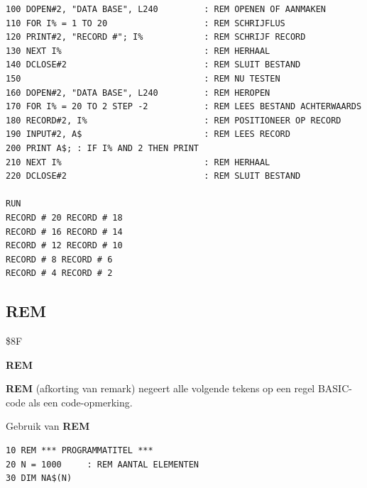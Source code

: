 \begin{description}[leftmargin=2cm,style=nextline]
\begin{tcolorbox}[colback=black,coltext=white]
\verbatimfont{\codefont}
\begin{verbatim}
100 DOPEN#2, "DATA BASE", L240         : REM OPENEN OF AANMAKEN
110 FOR I% = 1 TO 20                   : REM SCHRIJFLUS
120 PRINT#2, "RECORD #"; I%            : REM SCHRIJF RECORD
130 NEXT I%                            : REM HERHAAL
140 DCLOSE#2                           : REM SLUIT BESTAND
150                                    : REM NU TESTEN
160 DOPEN#2, "DATA BASE", L240         : REM HEROPEN
170 FOR I% = 20 TO 2 STEP -2           : REM LEES BESTAND ACHTERWAARDS
180 RECORD#2, I%                       : REM POSITIONEER OP RECORD
190 INPUT#2, A$                        : REM LEES RECORD
200 PRINT A$; : IF I% AND 2 THEN PRINT
210 NEXT I%                            : REM HERHAAL
220 DCLOSE#2                           : REM SLUIT BESTAND

RUN
RECORD # 20 RECORD # 18
RECORD # 16 RECORD # 14
RECORD # 12 RECORD # 10
RECORD # 8 RECORD # 6
RECORD # 4 RECORD # 2
\end{verbatim}
\end{tcolorbox}
\end{description}


\newpage
\subsection{REM}
\begin{description}[leftmargin=2cm,style=nextline]
\item [Token:]    \$8F

\item [Formaat:]   {\bf REM}

\item [Gebruik:]    {\bf REM} (afkorting van remark) negeert alle volgende tekens op een regel BASIC-code als een code-opmerking.

\item [Voorbeeld:]  Gebruik van {\bf REM}

\begin{tcolorbox}[colback=black,coltext=white]
\verbatimfont{\codefont}
\begin{verbatim}
10 REM *** PROGRAMMATITEL ***
20 N = 1000     : REM AANTAL ELEMENTEN
30 DIM NA$(N)
\end{verbatim}
\end{tcolorbox}
\end{description}

